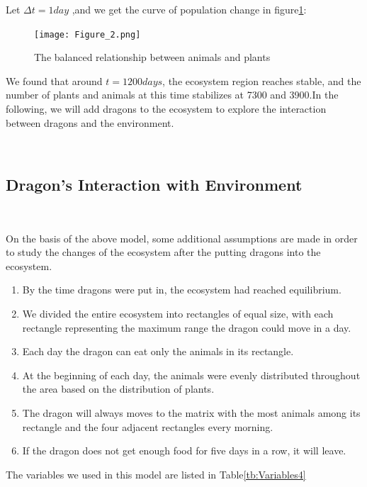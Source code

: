\documentclass{mcmthesis}
\begin{document}
Let $\Delta t=1day$ ,and we get the curve of population change in figure\ref{Figure_2}:
\begin{figure}[!htbp]
\centering
\texttt{[image: Figure\_2.png]}
\caption{The balanced relationship between animals and plants}\label{Figure_2}
\end{figure}

We found that around $t=1200days$, the ecosystem region reaches stable, and the number of plants and animals at this time stabilizes at 7300 and 3900.In the following, we will add dragons to the ecosystem to explore the interaction between dragons and the environment.

~\ \
\subsection{Dragon's Interaction with Environment}
~\ \

On the basis of the above model, some additional assumptions are made in order to study the changes of the ecosystem after the putting dragons into the ecosystem.
\begin{enumerate}
    \item By the time dragons were put in, the ecosystem had reached equilibrium.
    \item We divided the entire ecosystem into rectangles of equal size, with each rectangle representing the maximum range the dragon could move in a day.
    \item Each day the dragon can eat only the animals in its rectangle.
    \item At the beginning of each day, the animals were evenly distributed throughout the area based on the distribution of plants.
    \item The dragon will always moves to the matrix with the most animals among its rectangle and the four adjacent rectangles every morning.
    \item If the dragon does not get enough food for five days in a row, it will leave.
\end{enumerate}

The variables we used in this model are listed in Table\ref{tb:Variables4}
\end{document}
